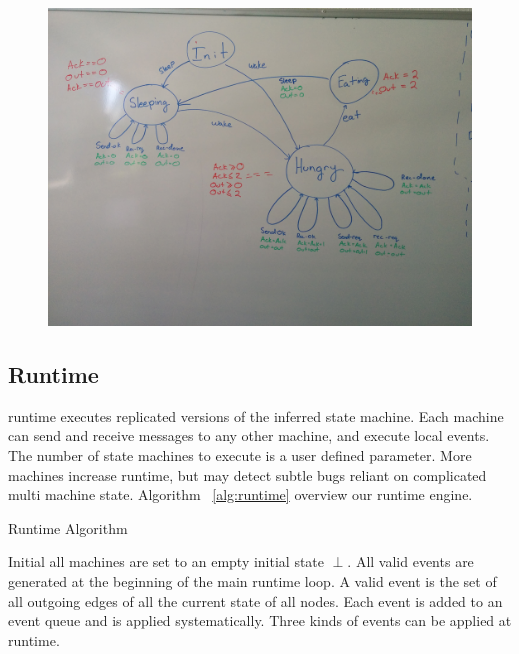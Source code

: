 \begin{figure}
    \includegraphics[width=\textwidth]{fig/relaxed}
\end{figure}


\subsection{Runtime}

 runtime executes replicated versions of the inferred state machine.
Each machine can send and receive messages to any other machine, and execute
local events. The number of state machines to execute is a user defined
parameter. More machines increase runtime, but may detect subtle bugs reliant
on complicated multi machine state. Algorithm ~\ref{alg:runtime} overview our
runtime engine.

\begin{algorithm}
    \caption{Runtime Algorithm}
    \label{alg:runtime}
\end{algorithm}

Initial all machines are set to an empty initial state $\perp$. All valid events are
generated at the beginning of the main runtime loop. A valid event is the set
of all outgoing edges of all the current state of all nodes. Each event is
added to an event queue and is applied systematically. Three kinds of events can
be applied at runtime.

